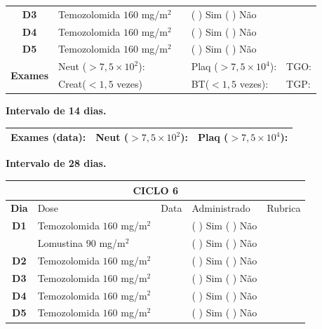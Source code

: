 \documentclass[11pt,a4paper,oldfontcommands]{memoir}
\begin{document}
\begin{center}
\begin{table}[H]
\begin{tabular}{p{1cm}p{5cm}|p{1cm}|p{4.5cm}|p{2cm}}
    \multicolumn{1}{c|}{\multirow{1}{*}{\textbf{D3}}}&{Temozolomida \(160\) mg/m\(^2\)}&&{(  ) Sim (  ) Não}&\\
    \multicolumn{1}{c|}{\multirow{1}{*}{\textbf{D4}}}&{Temozolomida \(160\) mg/m\(^2\)}&&{(  ) Sim (  ) Não}&\\
    \multicolumn{1}{c|}{\multirow{1}{*}{\textbf{D5}}}&{Temozolomida \(160\) mg/m\(^2\)}&&{(  ) Sim (  ) Não}&\\
    \hline
    \multicolumn{1}{c|}{\multirow{2}{*}{\textbf{Exames}}}&\multicolumn{2}{l|}{Neut (\(>7,5\times10^2\)):}&{Plaq (\(>7,5\times10^4\)):}&{TGO:}\\
    \cline{2-5}
    \multicolumn{1}{c|}{\multirow{2}{*}{{}}}&\multicolumn{2}{l|}{Creat(\(<1,5\) vezes)}&{BT(\(<1,5\) vezes):}&{TGP:}
    \\
    \hline
\end{tabular}
\end{table}
\textbf{Intervalo de 14 dias.}
\begin{table}[H]
\begin{tabular}{p{5cm}|p{5cm}|p{4.7cm}}
    \hline
    \textbf{Exames (data):}&{Neut (\(>7,5\times10^2\)):}&{Plaq (\(>7,5\times10^4\)):}
    \\
    \hline
\end{tabular}
\end{table}
\textbf{Intervalo de 28 dias.}
\begin{table}[H]
\begin{tabular}{p{1cm}p{5cm}|p{1cm}|p{4.5cm}|p{2cm}}
	\hline
	\multicolumn{5}{c}{\textbf{CICLO 6}}\\
\hline
    \multicolumn{1}{c|}{\multirow{1}{*}{\textbf{Dia}}}&{Dose}&{Data}&{Administrado}&{Rubrica} \\
    \hline
    \multicolumn{1}{c|}{\multirow{1}{*}{\textbf{D1}}}&{Temozolomida \(160\) mg/m\(^2\)}&&{(  ) Sim (  ) Não}&\\
    \multicolumn{1}{c|}{\multirow{1}{*}{\textbf{}}}&{Lomustina \(90\) mg/m\(^2\)}&&{(  ) Sim (  ) Não}&\\
    \multicolumn{1}{c|}{\multirow{1}{*}{\textbf{D2}}}&{Temozolomida \(160\) mg/m\(^2\)}&&{(  ) Sim (  ) Não}&\\
    \multicolumn{1}{c|}{\multirow{1}{*}{\textbf{D3}}}&{Temozolomida \(160\) mg/m\(^2\)}&&{(  ) Sim (  ) Não}&\\
    \multicolumn{1}{c|}{\multirow{1}{*}{\textbf{D4}}}&{Temozolomida \(160\) mg/m\(^2\)}&&{(  ) Sim (  ) Não}&\\
    \multicolumn{1}{c|}{\multirow{1}{*}{\textbf{D5}}}&{Temozolomida \(160\) mg/m\(^2\)}&&{(  ) Sim (  ) Não}&\\

\end{tabular}
\end{table}
\end{center}
\end{document}
